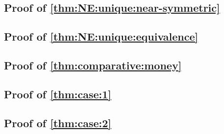 \subsection{Proof of \texorpdfstring{\cref{thm:NE:unique:near-symmetric}}{}}
\thmNENearSymmetric*


\subsection{Proof of \texorpdfstring{\cref{thm:NE:unique:equivalence}}{}}
\thmNEEquivalence*


\subsection{Proof of \texorpdfstring{\cref{thm:comparative:money}}{}}
\thmComparativeMoney*



\subsection{Proof of \texorpdfstring{\cref{thm:case:1}}{}}
\thmCaseOne*


\subsection{Proof of \texorpdfstring{\cref{thm:case:2}}{}}
\thmCaseTwo*
